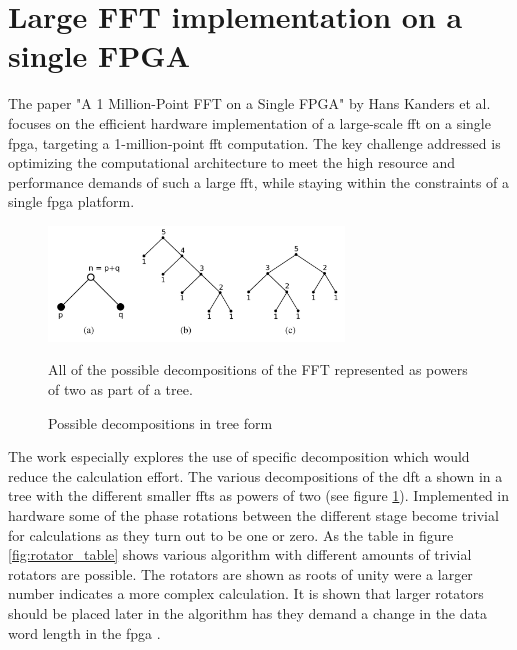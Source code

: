 \section{Large FFT implementation on a single FPGA}
The paper "A 1 Million-Point FFT on a Single FPGA" by Hans Kanders et al. \cite{kanders_1_2019} focuses on the efficient hardware implementation of a large-scale \ac{fft} on a single \ac{fpga}, targeting a 1-million-point \ac{fft} computation. The key challenge addressed is optimizing the computational architecture to meet the high resource and performance demands of such a large \ac{fft}, while staying within the constraints of a single \ac{fpga} platform.\par

\begin{figure}[h]
    \centering
    \includegraphics[width=0.7\textwidth]{images/trees.png}
    \captionsetup{justification=centering}
    \caption{Possible decompositions in tree form \cite{qureshi_generation_2011}}
            All of the possible decompositions of the FFT represented as powers of two as part of a tree.
    \label{fig:trees}
\end{figure}

The work especially explores the use of specific decomposition which would reduce the calculation effort. The various decompositions of the \ac{dft} a shown in a tree with the different smaller \ac{fft}s as powers of two (see figure \ref{fig:trees}). Implemented in hardware some of the phase rotations between the different stage become trivial for calculations as they turn out to be one or zero.  As the table in figure \ref{fig:rotator_table} shows various algorithm with different amounts of trivial rotators are possible. The rotators are shown as roots of unity were a larger number indicates a more complex calculation.  It is shown that larger rotators should be placed later in the algorithm has they demand a change in the data word length in the \ac{fpga} \cite{qureshi_generation_2011}.\par


